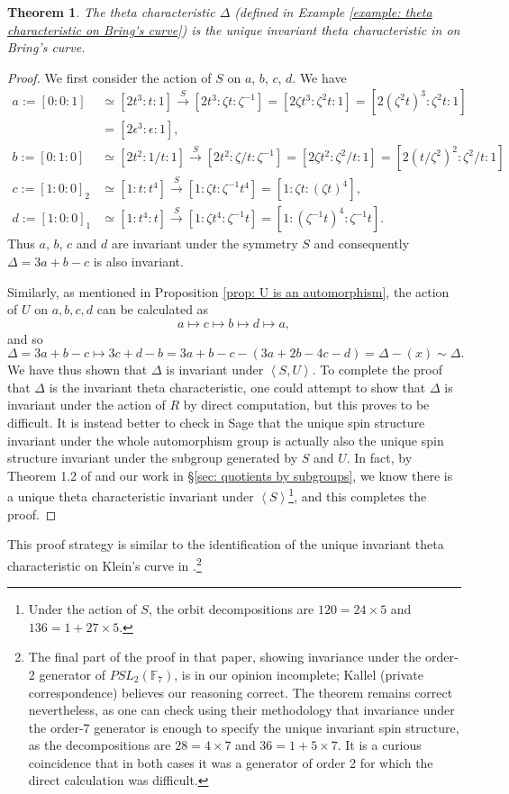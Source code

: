 \documentclass{amsart}
\newtheorem{theorem}{Theorem}[section]
\newcommand{\pangle}[1]{\left\langle #1 \right\rangle}
\begin{document}
\begin{theorem}\label{invarianttheta}
The theta characteristic $\Delta$ (defined in Example \ref{example: theta characteristic on Bring's curve}) is the unique invariant theta characteristic in on Bring's curve. 
\end{theorem}
\begin{proof}
We first consider the action of $S$ on $a$, $b$, $c$, $d$. We have
\begin{align*}
a:=[0:0:1]&\simeq[2t^3:t:1]\xrightarrow{S}[2t^3:\zeta t:\zeta^{-1}]=[2 \zeta t^3:\zeta^2 t:1]
=[2(\zeta^2 t)^3:\zeta^2 t:1]\\& =[2\epsilon^3:\epsilon:1],\\
 b:=[0:1:0]&\simeq[2t^2:1/t:1]\xrightarrow{S}[2t^2:\zeta/ t:\zeta^{-1}]=
 [2 \zeta t^2:\zeta^2/ t:1]=[2(t/{\zeta^2})^2:\zeta^2/ t:1]\\ 
 c:=[1:0:0]_2&\simeq[1:t:t^4]\xrightarrow{S}[1:\zeta t:\zeta^{-1} t^4]=[1:\zeta t:(\zeta t)^4],\\
 d:=[1:0:0]_1&\simeq[1:t^4:t]\xrightarrow{S}[1:\zeta t^4:\zeta^{-1} t]=[1:(\zeta^{-1} t)^4: \zeta^{-1} t].
\end{align*}
Thus $a$, $b$, $c$ and $d$ are invariant under the symmetry $S$ and consequently $\Delta= 3a+b-c$ is also invariant.

Similarly, as mentioned in Proposition \ref{prop: U is an automorphism}, the action of $U$ on $a,b,c,d$ can be calculated as 
\[
a \mapsto c \mapsto b \mapsto d \mapsto a  ,
\]
and so 
\[
\Delta  = 3a+b-c \mapsto 3c+d-b = 3a+b-c - (3a+2b-4c-d) = \Delta - (x) \sim \Delta  .
\]
We have thus shown that $\Delta$ is invariant under $\pangle{S, U}$. To complete the proof that $\Delta$ is the invariant theta characteristic, one could attempt to show that $\Delta$ is invariant under the action of $R$ by direct computation, but this proves to be difficult. It is instead better to check in Sage that the unique spin structure invariant under the whole automorphism group is actually also the unique spin structure invariant under the subgroup generated by $S$ and $U$. In fact, by Theorem 1.2 of \cite{Kallel2006} and our work in \S\ref{sec: quotients by subgroups}, we know there is a unique theta characteristic invariant under $\pangle{S}$\footnote{Under the action of $S$, the orbit decompositions are $120=24\times 5$ and $136 = 1+27\times 5$. }, and this completes the proof. 
\end{proof}
This proof strategy is similar to the identification of the unique invariant theta characteristic on Klein's curve in \cite{Kallel2006}.\footnote{The final part of the proof in that paper, showing invariance under the order-2 generator of $PSL_2(\mathbb{F}_7)$, is in our opinion incomplete; Kallel (private correspondence) believes our reasoning correct. The theorem remains correct nevertheless, as one can check using their methodology that invariance under the order-7 generator is enough to specify the unique invariant spin structure, as the decompositions are $28=4\times 7$ and $36 =1 + 5 \times 7$. It is a curious coincidence that in both cases it was a generator of order 2 for which the direct calculation was difficult.} 
\end{document}
